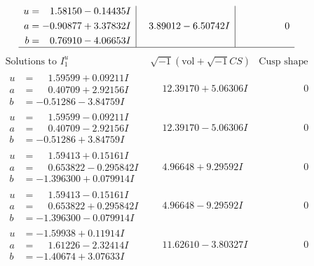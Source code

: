 \documentclass[1p]{elsarticle_modified}
\theoremstyle{definition}
\newcommand{\I}{\sqrt{-1}}
\begin{document}
$$\begin{array}{c|c|c}
\begin{aligned}
u &= \phantom{-}1.58150 - 0.14435 I \\
a &= -0.90877 + 3.37832 I \\
b &= \phantom{-}0.76910 - 4.06653 I\end{aligned}
 & \phantom{-}3.89012 - 6.50742 I & \phantom{-0.000000 } 0\\
 \hline 
 \end{array}$$\newpage$$\begin{array}{c|c|c}  
\text{Solutions to }I^u_{1}& \I (\text{vol} + \sqrt{-1}CS) & \text{Cusp shape}\\
 \hline 
\begin{aligned}
u &= \phantom{-}1.59599 + 0.09211 I \\
a &= \phantom{-}0.40709 + 2.92156 I \\
b &= -0.51286 - 3.84759 I\end{aligned}
 & \phantom{-}12.39170 + 5.06306 I & \phantom{-0.000000 } 0 \\ \hline\begin{aligned}
u &= \phantom{-}1.59599 - 0.09211 I \\
a &= \phantom{-}0.40709 - 2.92156 I \\
b &= -0.51286 + 3.84759 I\end{aligned}
 & \phantom{-}12.39170 - 5.06306 I & \phantom{-0.000000 } 0 \\ \hline\begin{aligned}
u &= \phantom{-}1.59413 + 0.15161 I \\
a &= \phantom{-}0.653822 - 0.295842 I \\
b &= -1.396300 + 0.079914 I\end{aligned}
 & \phantom{-}4.96648 + 9.29592 I & \phantom{-0.000000 } 0 \\ \hline\begin{aligned}
u &= \phantom{-}1.59413 - 0.15161 I \\
a &= \phantom{-}0.653822 + 0.295842 I \\
b &= -1.396300 - 0.079914 I\end{aligned}
 & \phantom{-}4.96648 - 9.29592 I & \phantom{-0.000000 } 0 \\ \hline\begin{aligned}
u &= -1.59938 + 0.11914 I \\
a &= \phantom{-}1.61226 - 2.32414 I \\
b &= -1.40674 + 3.07633 I\end{aligned}
 & \phantom{-}11.62610 - 3.80327 I & \phantom{-0.000000 } 0 \\ \hline\begin{aligned}

\end{aligned}
\end{array}$$
\end{document}
